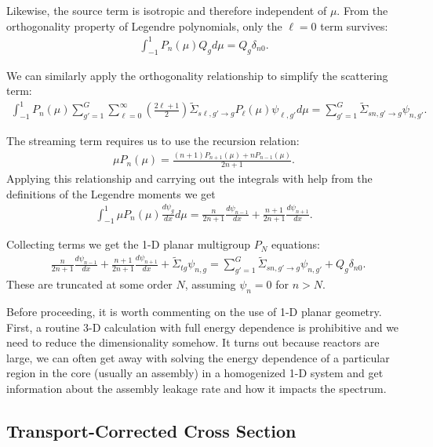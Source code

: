 Likewise, the source term is isotropic and therefore independent of $\mu$. From the orthogonality property of Legendre polynomials, only the $\ell = 0$ term survives:
\begin{align}
   \int_{-1}^1 P_n(\mu) Q_g d\mu  = Q_g \delta_{n0}.
\end{align}

We can similarly apply the orthogonality relationship to simplify the scattering term:
\begin{align}
    \int_{-1}^1 P_n(\mu) \sum_{g'=1}^G \sum_{\ell=0}^\infty \left( \frac{2 \ell + 1}{2} \right) \widetilde{\Sigma}_{s\ell,g' \rightarrow g} P_\ell(\mu) \psi_{\ell,g'} d\mu  =  \sum_{g'=1}^G \widetilde{\Sigma}_{sn,g' \rightarrow g}\psi_{n,g'} .
\end{align}

The streaming term requires us to use the recursion relation:
\begin{align}
  \mu P_n(\mu) = \frac{ (n+1) P_{n+1}(\mu) + n P_{n-1}(\mu) }{ 2n + 1 } . \nonumber
\end{align}
Applying this relationship and carrying out the integrals with help from the definitions of the Legendre moments we get
\begin{align}
  \int_{-1}^1 \mu P_n(\mu) \frac{d\psi_g}{dx} d\mu = \frac{n}{2n+1} \frac{d\psi_{n-1}}{dx} + \frac{n+1}{2n+1} \frac{d\psi_{n+1}}{dx} .
\end{align}

Collecting terms we get the 1-D planar multigroup $P_N$ equations:
\begin{align}
  &\frac{n}{2n+1} \frac{d\psi_{n-1}}{dx} + \frac{n+1}{2n+1} \frac{d\psi_{n+1}}{dx}  + \widetilde{\Sigma}_{tg} \psi_{n,g} = \sum_{g'=1}^G \widetilde{\Sigma}_{sn,g' \rightarrow g}\psi_{n,g'}  + Q_g \delta_{n0} .
\end{align}
These are truncated at some order $N$, assuming $\psi_n = 0$ for $n > N$.

Before proceeding, it is worth commenting on the use of 1-D planar geometry. First, a routine 3-D calculation with full energy dependence is prohibitive and we need to reduce the dimensionality somehow. It turns out because reactors are large, we can often get away with solving the energy dependence of a particular region in the core (usually an assembly) in a homogenized 1-D system and get information about the assembly leakage rate and how it impacts the spectrum.

\subsection{Transport-Corrected Cross Section}

